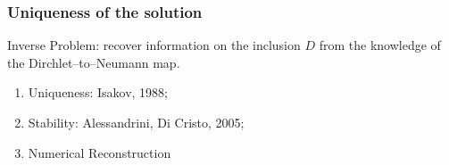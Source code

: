 \documentclass[10pt,xcolor={dvipsnames}]{beamer}
\theoremstyle{plain}
\theoremstyle{plain}
\begin{document}
\begin{frame}
 \frametitle{Uniqueness of the solution}
\begin{block}{}
{\color{blue}Inverse Problem}: recover information on the inclusion $D$ from the knowledge of the Dirchlet--to--Neumann
map.
\end{block}
\begin{enumerate}
 \item {\color{blue}Uniqueness}: Isakov, 1988;
 \item {\color{blue}Stability}: Alessandrini, Di Cristo, 2005;
 \item {\color{blue}Numerical Reconstruction}
\end{enumerate}
\end{frame}
\end{document}
